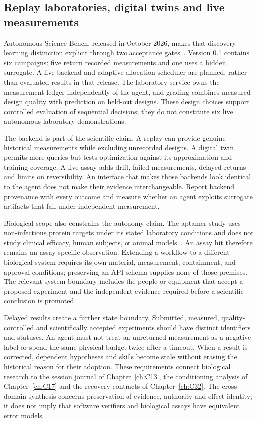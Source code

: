 \subsection{Replay laboratories, digital twins and live measurements}
Autonomous Science Bench, released in October 2026, makes that discovery--learning distinction explicit through two acceptance gates~\cite{wen2026asbench}. Version 0.1 contains six campaigns: five return recorded measurements and one uses a hidden surrogate. A live backend and adaptive allocation scheduler are planned, rather than evaluated results in that release. The laboratory service owns the measurement ledger independently of the agent, and grading combines measured-design quality with prediction on held-out designs. These design choices support controlled evaluation of sequential decisions; they do not constitute six live autonomous laboratory demonstrations.

The backend is part of the scientific claim. A replay can provide genuine historical measurements while excluding unrecorded designs. A digital twin permits more queries but tests optimization against its approximation and training coverage. A live assay adds drift, failed measurements, delayed returns and limits on reversibility. An interface that makes those backends look identical to the agent does not make their evidence interchangeable. Report backend provenance with every outcome and measure whether an agent exploits surrogate artifacts that fail under independent measurement.

Biological scope also constrains the autonomy claim. The aptamer study uses non-infectious protein targets under its stated laboratory conditions and does not study clinical efficacy, human subjects, or animal models~\cite{cutts2026aptamers}. An assay hit therefore remains an assay-specific observation. Extending a workflow to a different biological system requires its own material, measurement, containment, and approval conditions; preserving an API schema supplies none of those premises. The relevant system boundary includes the people or equipment that accept a proposed experiment and the independent evidence required before a scientific conclusion is promoted.

Delayed results create a further state boundary. Submitted, measured, quality-controlled and scientifically accepted experiments should have distinct identifiers and statuses. An agent must not treat an unreturned measurement as a negative label or spend the same physical budget twice after a timeout. When a result is corrected, dependent hypotheses and skills become stale without erasing the historical reason for their adoption. These requirements connect biological research to the session journal of Chapter~\ref{ch:C13}, the conditioning analysis of Chapter~\ref{ch:C17} and the recovery contracts of Chapter~\ref{ch:C32}. The cross-domain synthesis concerns preservation of evidence, authority and effect identity; it does not imply that software verifiers and biological assays have equivalent error models.
